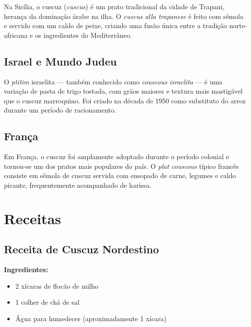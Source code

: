 \documentclass[12pt,a4paper,openright]{book}
\begin{document}
Na Sicília, o cuscuz (\textit{cuscus}) é um prato tradicional da cidade de Trapani, herança da dominação árabe na ilha. O \textit{cuscus alla trapanese} é feito com sêmola e servido com um caldo de peixe, criando uma fusão única entre a tradição norte-africana e os ingredientes do Mediterrâneo.

\section{Israel e Mundo Judeu}

O \textit{ptitim} israelita --- também conhecido como \textit{couscous israelita} --- é uma variação de pasta de trigo tostada, com grãos maiores e textura mais mastigável que o cuscuz marroquino. Foi criado na década de 1950 como substituto do arroz durante um período de racionamento.

\section{França}

Em França, o cuscuz foi amplamente adoptado durante o período colonial e tornou-se um dos pratos mais populares do país. O \textit{plat couscous} típico francês consiste em sêmola de cuscuz servida com ensopado de carne, legumes e caldo picante, frequentemente acompanhado de harissa.

\chapter{Receitas}

\section{Receita de Cuscuz Nordestino}

\textbf{Ingredientes:}
\begin{itemize}
    \item 2 xícaras de flocão de milho
    \item 1 colher de chá de sal
    \item Água para humedecer (aproximadamente 1 xícara)
\end{itemize}
\end{document}
